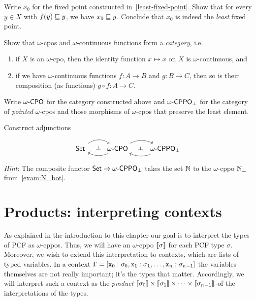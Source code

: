 \begin{exercise}\label{exer:least-fixed-point}
  Write \(x_0\) for the fixed point constructed in~\cref{least-fixed-point}.
  Show that for every \(y \in X\) with \(f(y) \sqsubseteq y\), we have \(x_0 \sqsubseteq y\).
  Conclude that \(x_0\) is indeed the \emph{least} fixed point.
\end{exercise}

\begin{exercise}\label{exer:category-of-cpos}
  Show that \(\omega\)-cpos and \(\omega\)-continuous functions form a
  \emph{category}, i.e.\
  \begin{enumerate}
  \item if \(X\) is an \(\omega\)-cpo, then the identity function
    \(x \mapsto x\) on \(X\) is \(\omega\)-continuous, and
  \item if we have \(\omega\)-continuous functions \(f \colon A \to B\) and
    \(g \colon B \to C\), then so is their composition (as functions)
    \(g \circ f \colon A \to C\).
  \end{enumerate}
\end{exercise}

\begin{exercise}\label{exer:adjunctions}

  Write \(\omegaCPO\) for the category constructed above and \(\omegaCPPObot\)
  for the category of \emph{pointed} \(\omega\)-cpos and those morphisms of
  \(\omega\)-cpos that preserve the least element.

  Construct adjunctions
  \[
  \begin{tikzcd}
    \Set
    \arrow[r, ""{name=F}, bend left=35] &
    \omegaCPO
    \arrow[l, ""{name=G}, bend left=25]
    \arrow[phantom, from=F, to=G, "\dashv" rotate=-90]
    \arrow[r, ""{name=F}, bend left=25] &
    \omegaCPPObot
    \arrow[l, ""{name=G}, bend left=20]
    \arrow[phantom, from=F, to=G, "\dashv" rotate=-90]
  \end{tikzcd}
\]
\emph{Hint}: The composite functor \(\Set \to \omegaCPPObot\) takes the set \(\mathbb N\) to
the \(\omega\)-cppo \(\mathbb N_\bot\) from~\cref{exam:N_bot}.
\end{exercise}

\section{Products: interpreting contexts}

As explained in the introduction to this chapter our goal is to interpret the
types of PCF as \(\omega\)-cppos. Thus, we will have an \(\omega\)-cppo
\(\llbracket\sigma\rrbracket\) for each PCF type \(\sigma\).
%
Moreover, we wish to extend this interpretation to contexts, which are lists of
typed variables. In a context
\(\Gamma = [\texttt x_0 : \sigma_0, \texttt x_1 : \sigma_1 , \dots , \texttt x_n :
\sigma_{n-1}]\) the variables themselves are not really important; it's the
types that matter. Accordingly, we will interpret such a context as the
\emph{product}
\(\llbracket\sigma_0\rrbracket \times \llbracket\sigma_1\rrbracket \times \cdots \times
\llbracket\sigma_{n-1}\rrbracket\) of the interpretations of the types.

